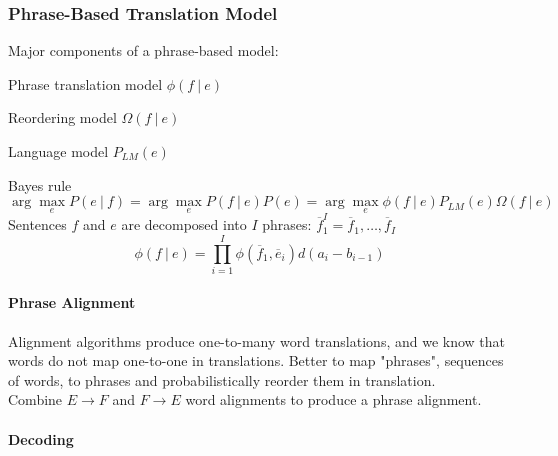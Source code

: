 \documentclass[10pt]{report}
\begin{document}
\subsubsection{Phrase-Based Translation Model}
Major components of a phrase-based model:
\begin{list}{}{}
	\item Phrase translation model $\phi(f\:|\:e)$
	\item Reordering model $\Omega(f\:|\:e)$
	\item Language model $P_{LM}(e)$
\end{list}
Bayes rule
$$\arg\max_e P(e\:|\:f) = \arg\max_e P(f\:|\:e)P(e) = \arg\max_e\phi(f\:|\:e)P_{LM}(e)\Omega(f\:|\:e)$$
Sentences $f$ and $e$ are decomposed into $I$ phrases: $\overline{f}_1^I = \overline{f}_1,\ldots,\overline{f}_I$
$$\phi(f\:|\:e)=\prod_{i=1}^I\phi(\overline{f}_1,\overline{e}_i)d(a_i-b_{i-1})$$
\paragraph{Phrase Alignment} Alignment algorithms produce one-to-many word translations, and we know that words do not map one-to-one in translations. Better to map "phrases", sequences of words, to phrases and probabilistically reorder them in translation.\\
Combine $E\rightarrow F$ and $F\rightarrow E$ word alignments to produce a phrase alignment.
\paragraph{Decoding}
\end{document}
